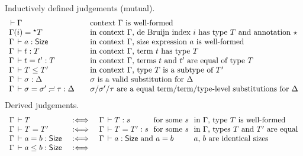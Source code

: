 \begin{figure}[htbp]
\flushleft
\hrulefill
\\[1ex]
Inductively defined judgements (mutual).
\[
\begin{array}{l@{\qquad}l}
  \der \Gamma & \mbox{context $\Gamma$ is well-formed} \\
  \Gamma(i) = \eann T & \mbox{in context $\Gamma$, de Bruijn index $i$ has type $T$ and annotation $\evar$} \\
  \Gamma \der a : \Size & \mbox{in context $\Gamma$, size expression $a$ is well-formed} \\
  \Gamma \der t : T & \mbox{in context $\Gamma$, term $t$ has type $T$} \\
  \Gamma \der t = t' : T & \mbox{in context $\Gamma$, terms $t$ and $t'$ are equal of type $T$} \\
  \Gamma \der T \leq T' & \mbox{in context $\Gamma$, type $T$ is a subtype of $T'$} \\
  \Gamma \der \sigma : \Delta & \mbox{$\sigma$ is a valid substitution for $\Delta$} \\
  \sueq \Gamma \sigma {\sigma'} \tau \Delta & \mbox{$\sigma$/$\sigma'$/$\tau$ are a equal term/term/type-level substitutions for $\Delta$} \\
\end{array}
\]
Derived judgements.
\[
\begin{array}{l@{\quad}l@{\quad}l@{~}l@{~~}l}
  \Gamma \der T & \defas & \Gamma \der T : s & \mforsome s
    & \mbox{in $\Gamma$, type $T$ is well-formed} \\
  \Gamma \der T = T' & \defas & \Gamma \der T = T' : s & \mforsome s
    & \mbox{in $\Gamma$, types $T$ and $T'$ are equal} \\
  \Gamma \der a = b : \Size & \defas &
    \multicolumn 2 {@{}l@{\quad}} {\Gamma \der a : \Size \mand a = b}
    & \mbox{$a$, $b$ are identical sizes} \\
  \Gamma \der a \leq b : \Size & \defas &

\end{array}\]
\end{figure}
